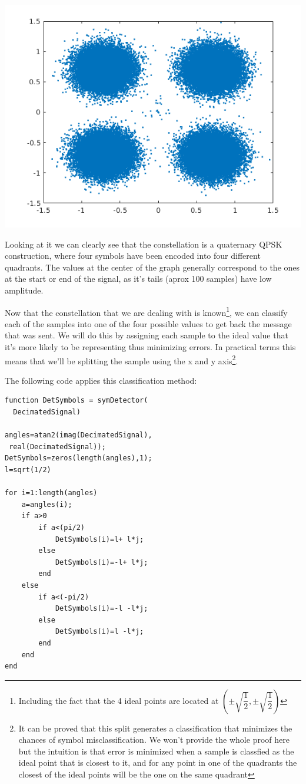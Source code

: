 \documentclass[conference,9pt]{IEEEtran}
\begin{document}
\includegraphics[scale=0.6]{res}

Looking at it we can clearly see that the constellation is a quaternary QPSK construction, where four symbols have been encoded into four different quadrants. The values at the center of the graph generally correspond to the ones at the start or end of the signal, as it's tails (aprox 100 samples) have low amplitude.

Now that the constellation that we are dealing with is known\footnote{Including the fact that the 4 ideal points are located at $(\pm\sqrt{\dfrac{1}{2}}, \pm\sqrt{\dfrac{1}{2}})$}, we can classify each of the samples into one of the four possible values to get back the message that was sent. We will do this by assigning each sample to the ideal value that it's more likely to be representing thus minimizing errors. In practical terms this means that we'll be splitting the sample using the x and y axis\footnote{It can be proved that this split generates a classification that minimizes the chances of symbol misclassification. We won't provide the whole proof here but the intuition is that error is minimized when a sample is classfied as the ideal point that is closest to it, and for any point in one of the quadrants the closest of the ideal points will be the one on the same quadrant}.

The following code applies this classification method:
\begin{verbatim}
function DetSymbols = symDetector(
  DecimatedSignal)

angles=atan2(imag(DecimatedSignal),
 real(DecimatedSignal));
DetSymbols=zeros(length(angles),1);
l=sqrt(1/2)

for i=1:length(angles)
    a=angles(i);
    if a>0
        if a<(pi/2)
            DetSymbols(i)=l+ l*j;
        else
            DetSymbols(i)=-l+ l*j;
        end
    else
        if a<(-pi/2)
            DetSymbols(i)=-l -l*j;
        else
            DetSymbols(i)=l -l*j;
        end
    end
end
\end{verbatim}
\end{document}
